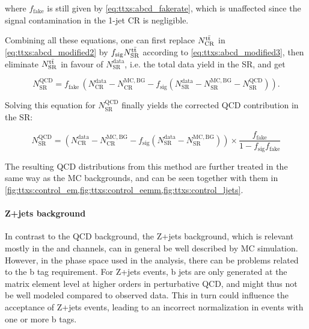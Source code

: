 \noindent where $f_{\mathrm{fake}}$ is still given by \cref{eq:ttxs:abcd_fakerate}, which is unaffected since the \ttbar signal contamination in the 1-jet CR is negligible.

Combining all these equations, one can first replace $N^{\mathrm{t \bar{t}}}_{\mathrm{CR}}$ in \cref{eq:ttxs:abcd_modified2} by $f_{\mathrm{sig}} N^{\mathrm{t \bar{t}}}_{\mathrm{SR}}$ according to \cref{eq:ttxs:abcd_modified3}, then eliminate $N^{\mathrm{t \bar{t}}}_{\mathrm{SR}}$ in favour of $N^{\mathrm{data}}_{\mathrm{SR}}$, i.e. the total data yield in the SR, and get

\begin{equation}
    N^{\mathrm{QCD}}_{\mathrm{SR}} = f_{\mathrm{fake}} \, \left( N^{\mathrm{data}}_{\mathrm{CR}} - N^{\mathrm{MC,BG}}_{\mathrm{CR}} - f_{\mathrm{sig}} \left( N^{\mathrm{data}}_{\mathrm{SR}} - N^{\mathrm{MC,BG}}_{\mathrm{SR}} - N^{\mathrm{QCD}}_{\mathrm{SR}} \right) \right) .
\end{equation}

Solving this equation for $N^{\mathrm{QCD}}_{\mathrm{SR}}$ finally yields the corrected QCD contribution in the SR:

\begin{equation}
\label{eq:ttxs:abcd_modified}
    N^{\mathrm{QCD}}_{\mathrm{SR}} = \left( N^{\mathrm{data}}_{\mathrm{CR}} - N^{\mathrm{MC,BG}}_{\mathrm{CR}} - f_{\mathrm{sig}} ( N^{\mathrm{data}}_{\mathrm{SR}} - N^{\mathrm{MC,BG}}_{\mathrm{SR}} )\right)
    \times \frac{ f_{\mathrm{fake}} } {1 - f_{\mathrm{sig}} f_{\mathrm{fake}}}
\end{equation}

The resulting QCD distributions from this method are further treated in the same way as the MC backgrounds, and can be seen together with them in \cref{fig:ttxs:control_em,fig:ttxs:control_eemm,fig:ttxs:control_ljets}.
  

\paragraph{Z+jets background}

In contrast to the QCD background, the Z+jets background, which is relevant mostly in the \ee and \mumu channels, can in general be well described by MC simulation. However, in the phase space used in the analysis, there can be problems related to the b tag requirement. For Z+jets events, b jets are only generated at the matrix element level at higher orders in perturbative QCD, and might thus not be well modeled compared to observed data. This in turn could influence the acceptance of Z+jets events, leading to an incorrect normalization in events with one or more b tags.

